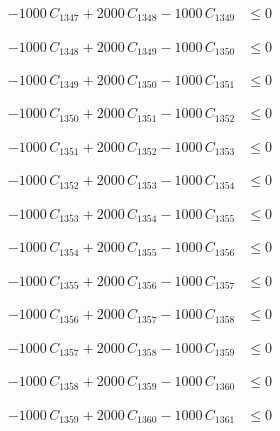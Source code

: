 \documentclass[a4paper,11pt]{article}
\begin{document}
\begin{align}
-1000\,C_{1347} + 2000\,C_{1348} - 1000\,C_{1349} &\leq 0 \nonumber
\end{align}

\begin{align}
-1000\,C_{1348} + 2000\,C_{1349} - 1000\,C_{1350} &\leq 0 \nonumber
\end{align}

\begin{align}
-1000\,C_{1349} + 2000\,C_{1350} - 1000\,C_{1351} &\leq 0 \nonumber
\end{align}

\begin{align}
-1000\,C_{1350} + 2000\,C_{1351} - 1000\,C_{1352} &\leq 0 \nonumber
\end{align}

\begin{align}
-1000\,C_{1351} + 2000\,C_{1352} - 1000\,C_{1353} &\leq 0 \nonumber
\end{align}

\begin{align}
-1000\,C_{1352} + 2000\,C_{1353} - 1000\,C_{1354} &\leq 0 \nonumber
\end{align}

\begin{align}
-1000\,C_{1353} + 2000\,C_{1354} - 1000\,C_{1355} &\leq 0 \nonumber
\end{align}

\begin{align}
-1000\,C_{1354} + 2000\,C_{1355} - 1000\,C_{1356} &\leq 0 \nonumber
\end{align}

\begin{align}
-1000\,C_{1355} + 2000\,C_{1356} - 1000\,C_{1357} &\leq 0 \nonumber
\end{align}

\begin{align}
-1000\,C_{1356} + 2000\,C_{1357} - 1000\,C_{1358} &\leq 0 \nonumber
\end{align}

\begin{align}
-1000\,C_{1357} + 2000\,C_{1358} - 1000\,C_{1359} &\leq 0 \nonumber
\end{align}

\begin{align}
-1000\,C_{1358} + 2000\,C_{1359} - 1000\,C_{1360} &\leq 0 \nonumber
\end{align}

\begin{align}
-1000\,C_{1359} + 2000\,C_{1360} - 1000\,C_{1361} &\leq 0 \nonumber
\end{align}
\end{document}
